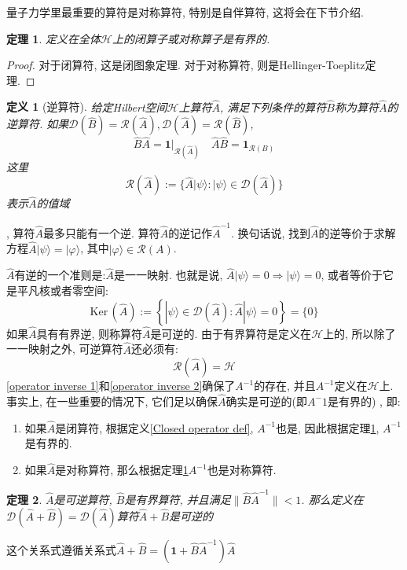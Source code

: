 \documentclass[a4paper,11pt]{article}
\newtheorem{definition}{\hspace{2em}定义}[section]
\newtheorem{theorem}{\hspace{2em}定理}[section]
\newtheorem{proof}{证明}[section]
\begin{document}
量子力学里最重要的算符是对称算符, 特别是自伴算符, 这将会在下节介绍.
\begin{theorem}\label{Bounded operator theorem}
  定义在全体$\mathcal{H}$上的闭算子或对称算子是有界的.
\end{theorem}
\begin{proof}
  对于闭算符, 这是闭图象定理. 对于对称算符, 则是Hellinger-Toeplitz定理.
\end{proof}
\begin{definition}[逆算符]
  给定Hilbert空间$\mathcal{H}$上算符$\hat{A}$, 满足下列条件的算符$\hat{B}$称为算符$\hat{A}$的逆算符. 如果$\mathcal{D}(\hat{B})=\mathcal{R}(\hat{A}), \mathcal{D}(\hat{A})=\mathcal{R}(\hat{B})$,
\begin{equation*}
  \hat{B}\hat{A}=\mathbf{1}|_{\mathcal{R}(\hat{A})}\quad\hat{A}\hat{B}=\mathbf{1}_{\mathcal{R}(B)}
\end{equation*}
这里
\begin{equation*}
  \mathcal{R}(\hat{A}):=\{\hat{A}|\psi\rangle:|\psi\rangle\in \mathcal{D}(\hat{A})\}
\end{equation*}
表示$\hat{A}$的值域
\end{definition}
, 算符$\hat{A}$最多只能有一个逆. 算符$\hat{A}$的逆记作$\hat{A}^{-1}$. 换句话说, 找到$\hat{A}$的逆等价于求解方程$\hat{A}|\psi\rangle=|\varphi\rangle$, 其中$|\varphi\rangle\in\mathcal{R}(A)$.

$\hat{A}$有逆的一个准则是:$\hat{A}$是一一映射. 也就是说, $\hat{A}|\psi\rangle=0\Longrightarrow|\psi\rangle=0$, 或者等价于它是平凡核或者零空间:
\begin{equation}\label{operator inverse 1}
  \mathrm{Ker}\,(\hat{A}):=\left\{|\psi\rangle\in\mathcal{D}(\hat{A}):\hat{A}|\psi\rangle=0\right\}=\{0\}
\end{equation}
如果$\hat{A}$具有有界逆, 则称算符$\hat{A}$是可逆的. 由于有界算符是定义在$\mathcal{H}$上的, 所以除了一一映射之外, 可逆算符$\hat{A}$还必须有:
\begin{equation}\label{operator inverse 2}
  \mathcal{R}(\hat{A})=\mathcal{H}
\end{equation}
\ref{operator inverse 1}和\ref{operator inverse 2}确保了$A^{-1}$的存在, 并且$A^{-1}$定义在$\mathcal{H}$上. 事实上, 在一些重要的情况下, 它们足以确保$\hat{A}$确实是可逆的(即$A^-1$是有界的) , 即:
\begin{enumerate}
  \item 如果$\hat{A}$是闭算符, 根据定义\ref{Closed operator def}, $A^{-1}$也是, 因此根据定理\ref{Bounded operator theorem}, $A^{-1}$是有界的.
  \item 如果$\hat{A}$是对称算符, 那么根据定理\ref{Bounded operator theorem}$A^{-1}$也是对称算符.
\end{enumerate}
\begin{theorem}\label{A+B inverse}
  $\hat{A}$是可逆算符, $\hat{B}$是有界算符, 并且满足$\|\hat{B}\hat{A}^{-1}\|<1$. 那么定义在$\mathcal{D}(\hat{A}+\hat{B})=\mathcal{D}(\hat{A})$算符$\hat{A}+\hat{B}$是可逆的
\end{theorem}
这个关系式遵循关系式$\hat{A}+\hat{B}=(\mathbf{1}+\hat{B}\hat{A}^{-1})\hat{A}$
\end{document}
